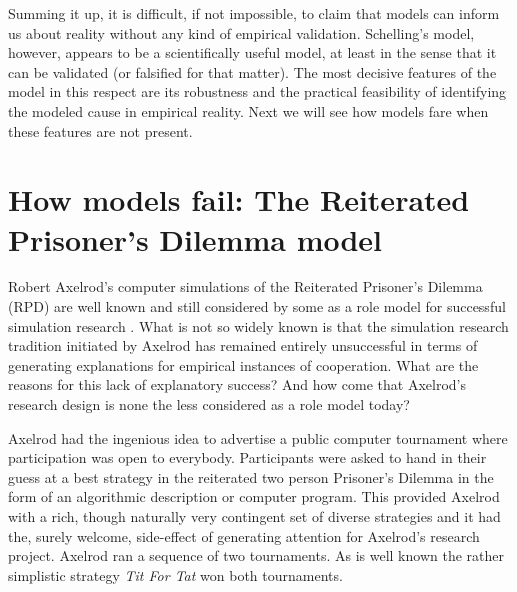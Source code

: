 \documentclass[12pt, english, a4paper]{article}
\begin{document}
Summing it up, it is difficult, if not impossible, to claim that
models can inform us about reality without any kind of empirical
validation. Schelling’s model, however, appears to be a scientifically
useful model, at least in the sense that it can be validated (or
falsified for that matter). The most decisive features of the model in
this respect are its robustness and the practical feasibility of
identifying the modeled cause in empirical reality. Next we will see
how models fare when these features are not present.


\section{How models fail: The Reiterated Prisoner’s  Dilemma model}

Robert Axelrod’s computer simulations of the Reiterated Prisoner’s
Dilemma (RPD) \citep{axelrod:1984} are well known and still considered
by some as a role model for successful simulation research
\citep[408-409]{rendell-et-al:2010a}. What is not so widely known is
that the simulation research tradition initiated by Axelrod has
remained entirely unsuccessful in terms of generating explanations for
empirical instances of cooperation. What are the reasons for this lack
of explanatory success? And how come that Axelrod’s research design is
none the less considered as a role model today?

Axelrod had the ingenious idea to advertise a public computer
tournament where participation was open to everybody. Participants
were asked to hand in their guess at a best strategy in the reiterated
two person Prisoner’s Dilemma in the form of an algorithmic
description or computer program. This provided Axelrod with a rich,
though naturally very contingent set of diverse strategies and it had
the, surely welcome, side-effect of generating attention for Axelrod’s
research project. Axelrod ran a sequence of two tournaments. As is
well known the rather simplistic strategy {\em Tit For Tat} won both
tournaments.
\end{document}
